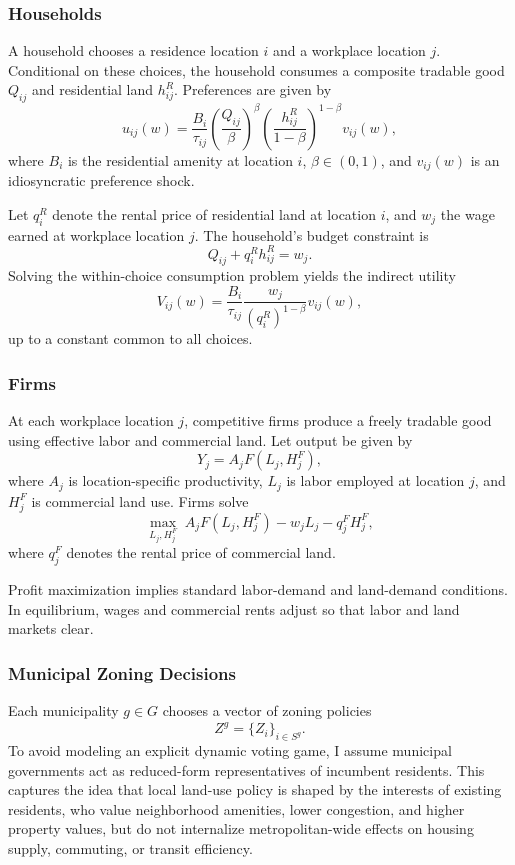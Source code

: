 \documentclass[12pt, a4paper]{article}
\begin{document}
\subsubsection{Households}

A household chooses a residence location \(i\) and a workplace location \(j\). Conditional on these choices, the household consumes a composite tradable good \(Q_{ij}\) and residential land \(h_{ij}^R\). Preferences are given by
\[
u_{ij}(w)=\frac{B_i}{\tau_{ij}}
\left(\frac{Q_{ij}}{\beta}\right)^{\beta}
\left(\frac{h_{ij}^R}{1-\beta}\right)^{1-\beta}
v_{ij}(w),
\]
where \(B_i\) is the residential amenity at location \(i\), \(\beta \in (0,1)\), and \(v_{ij}(w)\) is an idiosyncratic preference shock.

Let \(q_i^R\) denote the rental price of residential land at location \(i\), and \(w_j\) the wage earned at workplace location \(j\). The household's budget constraint is
\[
Q_{ij}+q_i^R h_{ij}^R = w_j.
\]
Solving the within-choice consumption problem yields the indirect utility
\[
V_{ij}(w)=\frac{B_i}{\tau_{ij}}
\frac{w_j}{(q_i^R)^{1-\beta}}v_{ij}(w),
\]
up to a constant common to all choices.

\subsubsection{Firms}

At each workplace location \(j\), competitive firms produce a freely tradable good using effective labor and commercial land. Let output be given by
\[
Y_j = A_j F(L_j, H_j^F),
\]
where \(A_j\) is location-specific productivity, \(L_j\) is labor employed at location \(j\), and \(H_j^F\) is commercial land use. Firms solve
\[
\max_{L_j,H_j^F}
\; A_j F(L_j,H_j^F)-w_jL_j-q_j^F H_j^F,
\]
where \(q_j^F\) denotes the rental price of commercial land.

Profit maximization implies standard labor-demand and land-demand conditions. In equilibrium, wages and commercial rents adjust so that labor and land markets clear.

\subsubsection{Municipal Zoning Decisions}

Each municipality \(g\in G\) chooses a vector of zoning policies
\[
Z^g=\{Z_i\}_{i\in S^g}.
\]
To avoid modeling an explicit dynamic voting game, I assume municipal governments act as reduced-form representatives of incumbent residents. This captures the idea that local land-use policy is shaped by the interests of existing residents, who value neighborhood amenities, lower congestion, and higher property values, but do not internalize metropolitan-wide effects on housing supply, commuting, or transit efficiency.
\end{document}
